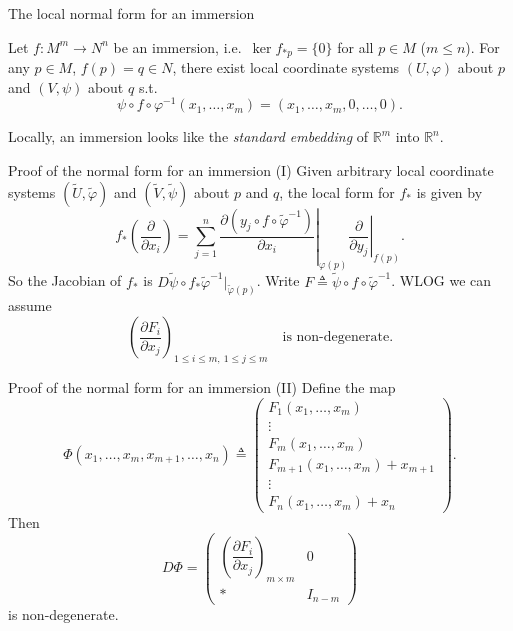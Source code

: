 \documentclass[10pt]{beamer}
\newcommand{\R}{\mathbb{R}}
\begin{document}
\begin{frame}{The local normal form for an immersion}
	\begin{theorem}
		Let $f : M^m \to N^n$ be an immersion, i.e.\
		$\ker f_{*p} = \{0\}$ for all $p \in M$ ($m \le n$). For any
		$p \in M$, $f(p) = q \in N$, there exist local coordinate
		systems $(U, \varphi)$ about $p$ and $(V, \psi)$ about $q$
		s.t.
		\[
			\psi \circ f \circ \varphi^{-1}(x_1, \dots, x_m)
			= (x_1, \dots, x_m, 0, \dots, 0).
		\]
	\end{theorem}
	\medskip
	Locally, an immersion looks like the \emph{standard embedding} of
	$\R^m$ into $\R^n$.
\end{frame}

\begin{frame}{Proof of the normal form for an immersion (I)}
	Given arbitrary local coordinate systems $(\widetilde{U},
		\widetilde{\varphi})$ and $(\widetilde{V}, \widetilde{\psi})$
	about $p$ and $q$, the local form for $f_*$ is given by
	\[
		f_*\left( \frac{\partial}{\partial x_i} \right)
		= \sum_{j=1}^{n}
		\left. \frac{\partial (y_j \circ f \circ
			\widetilde{\varphi}^{-1})}{\partial x_i} \right|_{\varphi(p)}
		\left. \frac{\partial}{\partial y_j} \right|_{f(p)} .
	\]
	So the Jacobian of $f_*$ is $D\widetilde{\psi} \circ f_*
		\widetilde{\varphi}^{-1}\big|_{\widetilde{\varphi}(p)}$. Write
	$F \triangleq \widetilde{\psi} \circ f \circ
		\widetilde{\varphi}^{-1}$. WLOG we can assume
	\[
		\left( \frac{\partial F_i}{\partial x_j}
		\right)_{1 \le i \le m,\ 1 \le j \le m}
		\quad \text{is non-degenerate.}
	\]
\end{frame}

\begin{frame}{Proof of the normal form for an immersion (II)}
	Define the map
	\[
		\Phi(x_1, \dots, x_m, x_{m+1}, \dots, x_n)
		\triangleq
		\begin{pmatrix}
			F_1(x_1, \dots, x_m)               \\
			\vdots                             \\
			F_m(x_1, \dots, x_m)               \\
			F_{m+1}(x_1, \dots, x_m) + x_{m+1} \\
			\vdots                             \\
			F_n(x_1, \dots, x_m) + x_n
		\end{pmatrix}.
	\]
	Then
	\[
		D\Phi =
		\begin{pmatrix}
			\left( \dfrac{\partial F_i}{\partial x_j} \right)_{m \times m} & 0       \\
			*                                                              & I_{n-m}
		\end{pmatrix}
	\]
	is non-degenerate.
\end{frame}
\end{document}
